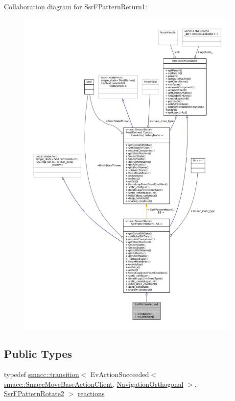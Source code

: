 Collaboration diagram for Ssr\+F\+Pattern\+Return1\+:
\nopagebreak
\begin{figure}[H]
\begin{center}
\leavevmode
\includegraphics[width=350pt]{structSsrFPatternReturn1__coll__graph}
\end{center}
\end{figure}
\subsection*{Public Types}
\begin{DoxyCompactItemize}
\item 
typedef \hyperlink{classsmacc_1_1transition}{smacc\+::transition}$<$ Ev\+Action\+Succeeded$<$ \hyperlink{classsmacc_1_1SmaccMoveBaseActionClient}{smacc\+::\+Smacc\+Move\+Base\+Action\+Client}, \hyperlink{classNavigationOrthogonal}{Navigation\+Orthogonal} $>$, \hyperlink{structSsrFPatternRotate2}{Ssr\+F\+Pattern\+Rotate2} $>$ \hyperlink{structSsrFPatternReturn1_a81c1b84527bc40fc910c7327df687650}{reactions}
\end{DoxyCompactItemize}
